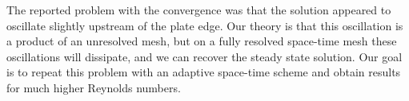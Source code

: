 \documentclass[Proposal.tex]{subfiles}
\begin{document}
The reported problem with the convergence was that the solution appeared to oscillate slightly upstream of the plate edge.
Our theory is that this oscillation is a product of an unresolved mesh, but on a fully resolved space-time mesh these oscillations will dissipate, 
and we can recover the steady state solution.
Our goal is to repeat this problem with an adaptive space-time scheme and obtain results for much higher Reynolds numbers.

\end{document}
